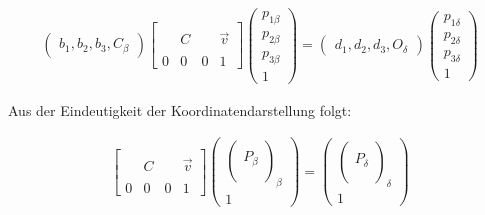 \begin{gather}
\begin{pmatrix}
b_1,b_2,b_3,C_\beta
\end{pmatrix}
\begin{bmatrix}
&  &  & \\
&  C&  &\vec{v} \\ 
&  &  & \\
0&0&0 & 1
\end{bmatrix}
\begin{pmatrix}
	p_{1\beta}\\
	p_{2\beta}\\
	p_{3\beta}\\
		1 
\end{pmatrix} =
\begin{pmatrix}
d_1,d_2,d_3,O_\delta
\end{pmatrix}
\begin{pmatrix}
p_{1\delta}\\p_{2\delta}\\p_{3\delta}\\1
\end{pmatrix}
\end{gather}

Aus der Eindeutigkeit der Koordinatendarstellung folgt:

\begin{gather}
\begin{bmatrix}
&  &  & \\
&  C&  &\vec{v} \\ 
&  &  & \\
0&0&0 & 1
\end{bmatrix}
\begin{pmatrix}
\begin{pmatrix}
\\
P_\beta\\
\\
\end{pmatrix}_\beta\\
1
\end{pmatrix}
=
\begin{pmatrix}
\begin{pmatrix}
\\
P_\delta\\
\\
\end{pmatrix}_\delta\\
1
\end{pmatrix}
\end{gather}\\


